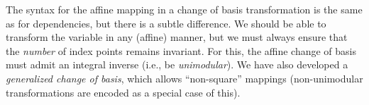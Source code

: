 The syntax for the affine mapping in a change of basis
transformation is the same as for dependencies, but there is a subtle
difference.  We should be able to transform the variable in any
(affine) manner, but we must always ensure that the {\em number} of
index points remains invariant.  For this, the affine change of basis
must admit an integral inverse (i.e., be {\em unimodular}).  We have
also developed a {\em generalized change of basis}, which allows
``non-square'' mappings (non-unimodular transformations are encoded as
a special case of this).


